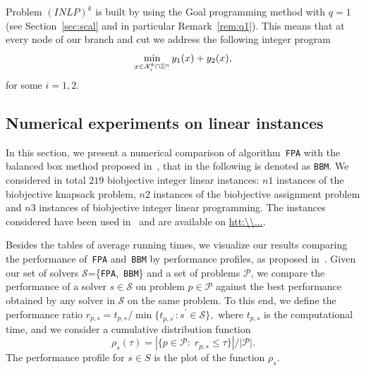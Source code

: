 \documentclass[preprint,12pt]{elsarticle}
\def\X{{\cal X}}
\def\Z{\mathbb{Z}}
\begin{document}
Problem $(INLP)^k$ is built by using the Goal programming method with $q = 1$ (see Section~\ref{sec:scal} and in particular Remark~\ref{rem:q1}).
This means that at every node of our branch and cut we address
the following integer program
\begin{equation}
 \min_{x\in \mathcal{\X}_i^k\cap \Z^n} y_1(x) + y_2(x),
\end{equation}
for some $i=1,2$.


\subsection{Numerical experiments on linear instances}\label{sec:explin}
In this section, we present a numerical comparison of algorithm~\texttt{FPA} with the
balanced box method proposed in~\cite{boland2015criterion}, that in the following is denoted as \texttt{BBM}.
We considered in total $219$ biobjective integer linear instances:
$n1$ instances of the biobjective knapsack problem, $n2$ instances of the biobjective assignment problem and $n3$
instances of biobjective integer linear programming.
The instances considered have been used in~\cite{boland2015criterion} and are available on \url{htt:\\...}.


Besides the tables of average running times, we visualize our results comparing the performance of~\texttt{FPA} and~\texttt{BBM}
by performance profiles, as proposed in~\cite{DM2002}.
Given our set of solvers $\mathcal{S}$=\{\texttt{FPA},~\texttt{BBM}\} and a set of problems $\mathcal{P}$,
we compare the performance of  a solver $s \in \mathcal{S}$ on problem $p \in \mathcal{P}$
against the best performance obtained by any solver in $\mathcal{S}$
on the same problem. To this end, we define the performance ratio
$
r_{p,s} = t_{p,s}/\min\{t_{p,s^\prime}: s^\prime \in\mathcal{S}\},
$
where $t_{p,s}$ is the computational time, and we consider a cumulative distribution
function
\[
\rho_s(\tau) = |\{p\in \mathcal{P}:\; r_{p,s}\leq \tau \}| /|\mathcal{P}|.
\]
The performance profile for $s \in S$ is the plot of the function $\rho_s$.

\end{document}
